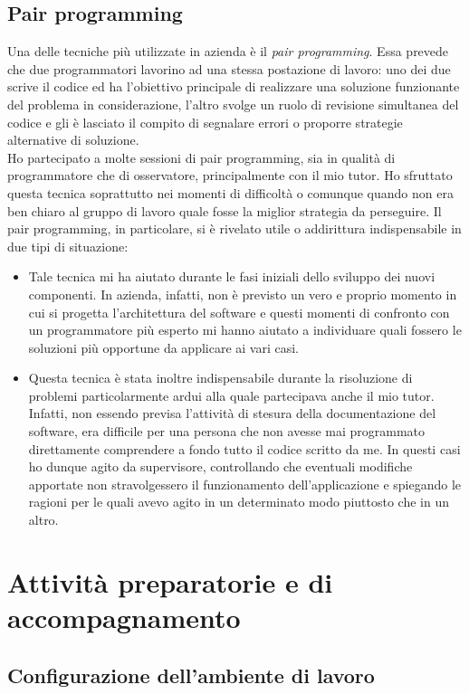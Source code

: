 		\subsection{Pair programming}
			Una delle tecniche più utilizzate in azienda è il \emph{pair programming}. Essa prevede che due programmatori lavorino
			ad una stessa postazione di lavoro: uno dei due scrive il codice ed ha l'obiettivo principale di realizzare una soluzione
			funzionante del problema in considerazione, l'altro svolge un ruolo di revisione simultanea del codice e gli è lasciato il
			compito di segnalare errori o proporre strategie alternative di soluzione.\\
			Ho partecipato a molte sessioni di pair programming, sia in qualità di programmatore che di osservatore, principalmente con
			il mio tutor. Ho sfruttato questa tecnica soprattutto nei momenti di difficoltà o comunque quando non era ben chiaro al
			gruppo di lavoro quale fosse la miglior strategia da perseguire. Il pair programming, in particolare, si è rivelato utile o
			addirittura indispensabile in due tipi di situazione:
			\begin{itemize}
				\item Tale tecnica mi ha aiutato durante le fasi iniziali dello sviluppo dei nuovi componenti. In azienda, infatti,
				non è previsto un vero e proprio momento in cui si progetta l'architettura del software e questi momenti di
				confronto con un programmatore più esperto mi hanno aiutato a individuare quali fossero le soluzioni più opportune
				da applicare ai vari casi.
				\item Questa tecnica è stata inoltre indispensabile durante la risoluzione di problemi particolarmente ardui alla
				quale partecipava anche il mio tutor. Infatti, non essendo previsa l'attività di stesura della documentazione del
				software, era difficile per una persona che non avesse mai programmato direttamente comprendere a fondo tutto il
				codice scritto da me. In questi casi ho dunque agito da supervisore, controllando che eventuali modifiche apportate
				non stravolgessero il funzionamento dell'applicazione e spiegando le ragioni per le quali avevo agito in un
				determinato modo piuttosto che in un altro.
			\end{itemize}
	\section{Attività preparatorie e di accompagnamento}
		\subsection{Configurazione dell'ambiente di lavoro}
